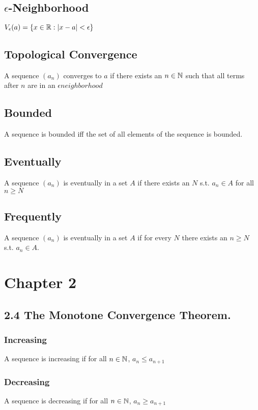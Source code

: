 \documentclass{article}
\begin{document}
\subsection{$\epsilon$-Neighborhood}
$V_\epsilon (a) = \{x \in \protect\mathbb{R} : |x-a| < \epsilon\}$

\subsection{Topological Convergence}
A sequence $(a_n)$ converges to $a$ if there exists an $n \in \protect\mathbb{N}$ such that all terms after $n$ are in an $\epsilon neighborhood$

\subsection{Bounded}
A sequence is bounded iff the set of all elements of the sequence is bounded.

\subsection{Eventually}
A sequence $(a_n)$ is eventually in a set $A$ if there exists an $N$ s.t. $a_n \in A$ for all $n \ge N$

\subsection{Frequently}
A sequence $(a_n)$ is eventually in a set $A$ if for every $N$  there exists an $n \ge N$ s.t. $a_n \in A$.

\section*{Chapter 2}
\subsection*{2.4 The Monotone Convergence Theorem.}

\subsubsection*{Increasing}
A sequence is increasing if for all $n \in \protect\mathbb{N}$, $a_n \le a_{n+1}$
\subsubsection*{Decreasing}
A sequence is decreasing if for all $n \in \protect\mathbb{N}$, $a_n \ge a_{n+1}$
\end{document}
